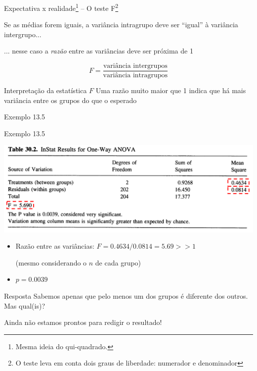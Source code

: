 \documentclass{beamer}
\begin{document}
\begin{frame}{\scriptsize Expectativa x realidade\footnote{\scriptsize Mesma ideia do qui-quadrado.} -- O teste F\footnote{\scriptsize O teste leva em conta dois graus de liberdade: numerador e denominador}}
  \begin{block}{}
    \small
    Se as médias forem iguais, a variância intragrupo deve ser ``igual'' à variância intergrupo...

    \bigskip
    ... nesse caso a {\em razão} entre as variâncias deve ser próxima de 1
  \end{block}

  $$F = \frac{\text{variância intergrupos}}{\text{variância intragrupos}}$$

  \begin{block}{Interpretação da estatística $F$}
    Uma razão muito maior que 1 indica que há mais variância entre os grupos do que o esperado
  \end{block}
\end{frame}

\begin{frame}[label=exemplo13.5-anova]{\scriptsize Exemplo 13.5}
  \begin{exampleblock}{Exemplo 13.5}
    \footnotesize
    \begin{center}
      \includegraphics[width=\textwidth]{Cap13-30/exemplo13_5-3}
    \end{center}
    \begin{itemize}
      \scriptsize
    \item Razão entre as variâncias: $F = 0.4634/0.0814 = 5.69 >> 1$

      {\tiny (mesmo considerando o $n$ de cada grupo)}
    \item $p=0.0039$
    \end{itemize}
  \end{exampleblock}
\end{frame}

\begin{frame}{\scriptsize }
  \begin{block}{Resposta}
    Sabemos apenas que pelo menos um dos grupos é diferente dos outros.
    Mas qual(is)?

    \bigskip
    Ainda não estamos prontos para redigir o resultado!
  \end{block}
\end{frame}
\end{document}
